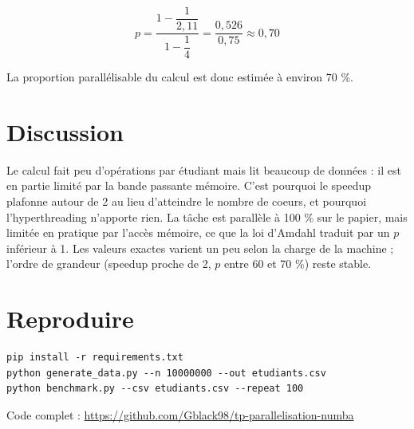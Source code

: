 \documentclass[11pt,a4paper]{article}
\begin{document}
\[
p = \frac{1 - \dfrac{1}{2{,}11}}{1 - \dfrac{1}{4}}
  = \frac{0{,}526}{0{,}75}
  \approx 0{,}70
\]

La proportion parallélisable du calcul est donc estimée à environ 70 \%.

\section{Discussion}

Le calcul fait peu d'opérations par étudiant mais lit beaucoup de données : il
est en partie limité par la bande passante mémoire. C'est pourquoi le speedup
plafonne autour de 2 au lieu d'atteindre le nombre de coeurs, et pourquoi
l'hyperthreading n'apporte rien. La tâche est parallèle à 100 \% sur le papier,
mais limitée en pratique par l'accès mémoire, ce que la loi d'Amdahl traduit par
un $p$ inférieur à 1. Les valeurs exactes varient un peu selon la charge de la
machine ; l'ordre de grandeur (speedup proche de 2, $p$ entre 60 et 70 \%) reste
stable.

\section{Reproduire}

\begin{verbatim}
pip install -r requirements.txt
python generate_data.py --n 10000000 --out etudiants.csv
python benchmark.py --csv etudiants.csv --repeat 100
\end{verbatim}

Code complet : \url{https://github.com/Gblack98/tp-parallelisation-numba}
\end{document}
